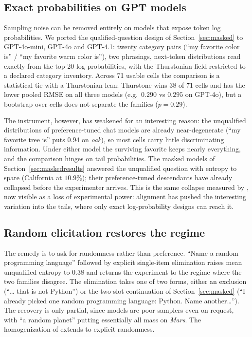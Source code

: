 \documentclass[11pt]{article}
\begin{document}
\subsection{Exact probabilities on GPT models}

Sampling noise can be removed entirely on models that expose token log
probabilities. We ported the qualified-question design of
Section~\ref{sec:masked} to GPT-4o-mini, GPT-4o and GPT-4.1: twenty
category pairs (``my favorite color is'' / ``my favorite warm color
is''), two phrasings, next-token distributions read exactly from the
top-20 log probabilities, with the Thurstonian field restricted to a
declared category inventory. Across 71 usable cells the comparison is a
statistical tie with a Thurstonian lean: Thurstone wins 38 of 71 cells
and has the lower pooled RMSE on all three models (e.g.\ $0.290$ vs
$0.295$ on GPT-4o), but a bootstrap over cells does not separate the
families ($p = 0.29$).

The instrument, however, has weakened for an interesting reason: the
unqualified distributions of preference-tuned chat models are already
near-degenerate (``my favorite tree is'' puts $0.94$ on \emph{oak}),
so most cells carry little discriminating information. Under either
model the surviving favorite keeps nearly everything, and the comparison
hinges on tail probabilities. The masked models of
Section~\ref{sec:maskedresults} answered the unqualified question with
entropy to spare (California at $10.9\%$); their preference-tuned
descendants have already collapsed before the experimenter arrives. This
is the same collapse measured by \cite{cekinmez2026}, now visible as a
loss of experimental power: alignment has pushed the interesting
variation into the tails, where only exact log-probability designs can
reach it.

\subsection{Random elicitation restores the regime}

The remedy is to ask for randomness rather than preference. ``Name a
random programming language'' followed by explicit single-item
elimination raises mean unqualified entropy to $0.38$ and returns the
experiment to the regime where the two families disagree. The elimination
takes one of two forms, either an exclusion (``\ldots{} that is not
Python'') or the two-slot continuation of Section~\ref{sec:masked} (``I
already picked one random programming language: Python. Name
another\ldots''). The recovery is only partial, since
models are poor samplers even on request, with ``a random planet''
putting essentially all mass on \emph{Mars}. The homogenization of
\cite{jiang2026} extends to explicit randomness.
\end{document}
